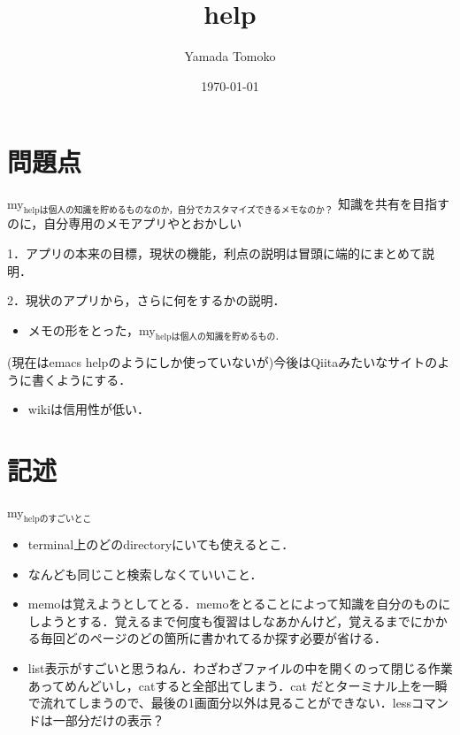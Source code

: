 \documentclass[11pt]{article}
\author{Yamada Tomoko}
\date{\today}
\title{help}
\begin{document}
\maketitle
\tableofcontents

\section{問題点}
\label{sec-1}
my$_{\text{helpは個人の知識を貯めるものなのか，自分でカスタマイズできるメモなのか？}}$
知識を共有を目指すのに，自分専用のメモアプリやとおかしい

1．アプリの本来の目標，現状の機能，利点の説明は冒頭に端的にまとめて説明．

2．現状のアプリから，さらに何をするかの説明．


\begin{itemize}
\item メモの形をとった，my$_{\text{helpは個人の知識を貯めるもの．}}$
\end{itemize}
(現在はemacs helpのようにしか使っていないが)今後はQiitaみたいなサイトのように書くようにする．

\begin{itemize}
\item wikiは信用性が低い．
\end{itemize}

\section{記述}
\label{sec-2}
my$_{\text{helpのすごいとこ}}$
\begin{itemize}
\item terminal上のどのdirectoryにいても使えるとこ．
\item なんども同じこと検索しなくていいこと．
\item memoは覚えようとしてとる．memoをとることによって知識を自分のものにしようとする．覚えるまで何度も復習はしなあかんけど，覚えるまでにかかる毎回どのページのどの箇所に書かれてるか探す必要が省ける．
\item list表示がすごいと思うねん．わざわざファイルの中を開くのって閉じる作業あってめんどいし，catすると全部出てしまう．cat だとターミナル上を一瞬で流れてしまうので、最後の1画面分以外は見ることができない．lessコマンドは一部分だけの表示？
\end{itemize}
\end{document}
